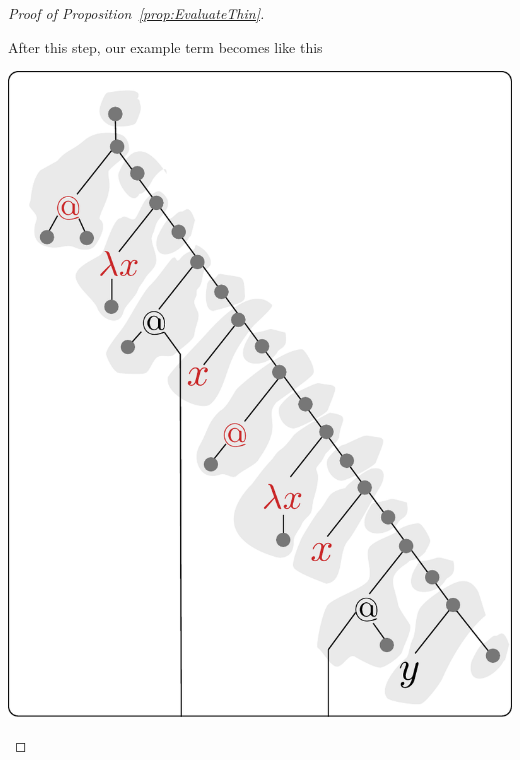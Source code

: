 \begin{proof}[Proof of Proposition~\ref{prop:EvaluateThin}]
\begin{enumerate}
 After this step, our example term becomes like this 
\begin{center}
\includegraphics[scale=.3]{pictures/running-thin-4}
\end{center}


\end{enumerate}
\end{proof}
